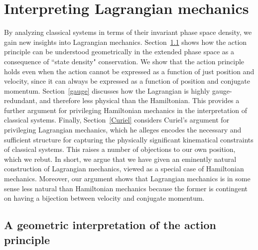 \documentclass[letterpaper]{article}
\begin{document}

\section{Interpreting Lagrangian mechanics}
\label{Lagrangian}

By analyzing classical systems in terms of their invariant phase space density, we gain new insights into Lagrangian mechanics. Section~\ref{action} shows how the action principle can be understood geometrically in the extended phase space as a consequence of ``state density" conservation. We show that the action principle holds even when the action cannot be expressed as a function of just position and velocity, since it can always be expressed as a function of position and conjugate momentum. Section~\ref{gauge} discusses how the Lagrangian is highly gauge-redundant, and therefore less physical than the Hamiltonian. This provides a further argument for privileging Hamiltonian mechanics in the interpretation of classical systems. Finally, Section~\ref{Curiel} considers Curiel's \parencites*[]{Curiel} argument for privileging Lagrangian mechanics, which he alleges encodes the necessary and sufficient structure for capturing the physically significant kinematical constraints of classical systems. This raises a number of objections to our own position, which we rebut. In short, we argue that we have given an eminently natural construction of Lagrangian mechanics, viewed as a special case of Hamiltonian mechanics. Moreover, our argument shows that Lagrangian mechanics is in some sense less natural than Hamiltonian mechanics because the former is contingent on having a bijection between velocity and conjugate momentum.


\subsection{A geometric interpretation of the action principle}
\label{action}


\end{document}
